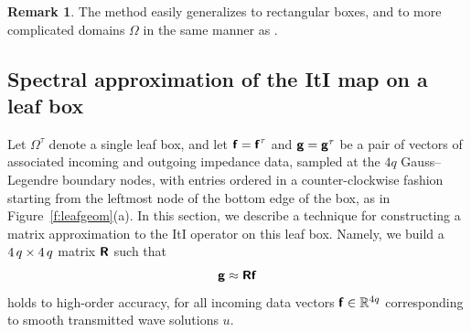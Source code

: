 \documentclass[11pt,final]{amsart}
\theoremstyle{definition}
\newtheorem{remark}{Remark}
\numberwithin{remark}{section}
\numberwithin{definition}{section}
\numberwithin{pro}{section}
\begin{document}
\begin{remark}
The method easily generalizes to rectangular boxes, and to more complicated domains $\Omega$
in the same manner as \cite{2012_martinsson_spectralcomposite}.
\end{remark}



\subsection{Spectral approximation of the ItI map on a leaf box}
\label{sec:box}

Let $\Omega^\tau$ denote a single leaf box,
and let $\bm{\mathsf{f}}= \bm{\mathsf{f}}^\tau$ and $\bm{\mathsf{g}}=\bm{\mathsf{g}}^\tau$ be a pair of
vectors of associated incoming and outgoing impedance data, sampled at the
$4q$ Gauss--Legendre boundary nodes, with entries ordered in a
counter-clockwise fashion starting from the leftmost node of the
bottom edge of the box, as in Figure~\ref{f:leafgeom}(a).
In this section, we describe a technique for constructing
 a matrix approximation to the ItI operator on this leaf box.
Namely, we build a
$4\,q \times4\, q$ matrix $\bm{\mathsf{R}}$  such that
$$\bm{\mathsf{g}} \approx \bm{\mathsf{R}} \bm{\mathsf{f}}$$ holds to high-order accuracy,
for all incoming data vectors $\bm{\mathsf{f}}\in\mathbb{R}^{4q}$ corresponding to smooth transmitted wave
solutions $u$.


\end{document}
